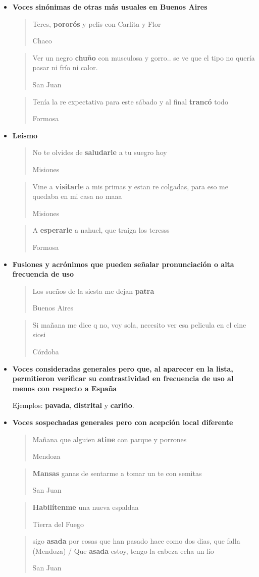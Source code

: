 \begin{itemize}
\item \textbf{Voces sinónimas de otras más usuales en Buenos Aires}

  \blockquote[Chaco]{Teres, \textbf{pororós} y pelis con Carlita y Flor}

  \blockquote[San Juan]{Ver un negro \textbf{chuño} con musculosa y gorro.. se ve que el tipo no quería pasar ni frío ni calor.}

  \blockquote[Formosa]{Tenía la re expectativa para este sábado y al final \textbf{trancó} todo }

\item \textbf{Leísmo}

  \blockquote[Misiones]{No te olvides de \textbf{saludarle} a tu suegro hoy}

  \blockquote[Misiones]{Vine a \textbf{visitarle} a mis primas y estan re colgadas, para eso me quedaba en mi casa no maaa }

  \blockquote[Formosa]{A \textbf{esperarle} a nahuel, que traiga los teresss }

\item \textbf{Fusiones y acrónimos que pueden señalar pronunciación o alta frecuencia de uso}

  \blockquote[Buenos Aires]{Los sueños de la siesta me dejan \textbf{patra} }

  \blockquote[Córdoba]{Si mañana me dice q no, voy sola, necesito ver esa pelicula en el cine siosi}

\item \textbf{Voces consideradas generales pero que, al aparecer en la lista, permitieron verificar su contrastividad en frecuencia de uso al menos con respecto a España}

Ejemplos: \textbf{pavada}, \textbf{distrital} y \textbf{cariño}.

\item \textbf{Voces sospechadas generales pero con acepción local diferente}

  \blockquote[Mendoza]{Mañana que alguien \textbf{atine} con parque y porrones}

  \blockquote[San Juan]{\textbf{Mansas} ganas de sentarme a tomar un te con semitas}

  \blockquote[Tierra del Fuego]{\textbf{Habilítenme} una nueva espaldaa}

  \blockquote[San Juan]{sigo \textbf{asada} por cosas que han pasado hace como dos dias, que falla (Mendoza) / Que \textbf{asada} estoy, tengo la cabeza echa un lío}



\end{itemize}
